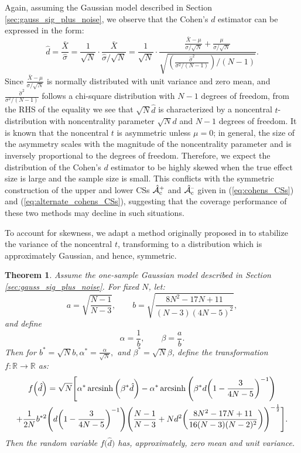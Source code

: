 Again, assuming the Gaussian model described in Section \ref{sec:gauss_sig_plus_noise}, we observe that the Cohen's $d$ estimator can be expressed in the form: 
\begin{equation}
\label{eq:cohens_d_estimator}
\hat{d} = \frac{\bar{X}}{\hat{\sigma}} =  \frac{1}{\sqrt{N}} \cdot \frac{\bar{X}}{\hat{\sigma}/\sqrt{N}} = \frac{1}{\sqrt{N}} \cdot \frac{\frac{\bar{X} - \mu}{\sigma / \sqrt{N}} + \frac{\mu}{\sigma / \sqrt{N}}}{\sqrt{\left(\frac{\hat{\sigma}^{2}}{\sigma^{2}/(N-1)}\right)/(N-1)}}.
\end{equation}
Since $\frac{\bar{X} - \mu}{\sigma / \sqrt{N}}$ is normally distributed with unit variance and zero mean, and $\frac{\hat{\sigma}^{2}}{\sigma^{2}/(N-1)}$ follows a chi-square distribution with $N-1$ degrees of freedom, from the RHS of the equality we see that $\sqrt{N}\hat{d}$ is characterized by a noncentral $t$-distribution with noncentrality parameter $\sqrt{N}d$ and $N - 1$ degrees of freedom. It is known that the noncentral $t$ is asymmetric unless $\mu = 0$; in general, the size of the asymmetry scales with the magnitude of the noncentrality parameter and is inversely proportional to the degrees of freedom. Therefore, we expect the distribution of the Cohen's $d$ estimator to be highly skewed when the true effect size is large and the sample size is small. This conflicts with the symmetric construction of the upper and lower CSs $\operatorname{\hat{\mathcal{A}}_{c}^+}$ and $\operatorname{\hat{\mathcal{A}}_{c}^{\textrm{--}}}$ given in (\ref{eq:cohens_CSs}) and (\ref{eq:alternate_cohens_CSs}), suggesting that the coverage performance of these two methods may decline in such situations. 

To account for skewness, we adapt a method originally proposed in \citet*{Laubscher1960-px} to stabilize the variance of the noncentral $t$, transforming to a distribution which is approximately Gaussian, and hence, symmetric.
\newtheorem{cohen_theorem}{Theorem}
\begin{cohen_theorem} 
\label{thm:Theorem_1}
Assume the one-sample Gaussian model described in Section \ref{sec:gauss_sig_plus_noise}. For fixed $N$, let: $$a = \sqrt{\frac{N-1}{N-3}}, \qquad b = \sqrt{\frac{8N^{2}-17N + 11}{(N-3)(4N-5)^{2}}},$$
and define $$\alpha = \frac{1}{b}, \qquad \beta = \frac{a}{b}.$$
Then for $b^{*}=\sqrt{N}b, \alpha^{*}=\frac{\alpha}{\sqrt{N}},$ and $\beta^{*}=\sqrt{N}\beta$, define the transformation $f : \mathbb{R} \rightarrow \mathbb{R}$ as:
\begin{multline}
    f\Big(\hat{d}\Big) = \sqrt{N} \Bigg[\alpha^{*} \operatorname{arcsinh}\bigg({\beta^{*} \hat{d}}\bigg) - \alpha^{*} \operatorname{arcsinh}\Bigg({\beta^{*} d} \bigg(1 - \frac{3}{4N - 5}\bigg)^{-1} \Bigg) \\
                + \frac{1}{2N}b^{*2}\Bigg(d \bigg(1 - \frac{3}{4N - 5}\bigg)^{-1} \Bigg)\Bigg(\frac{N-1}{N-3} + N d^{2} \bigg(\frac{8N^{2} - 17N + 11}{16(N-3)(N-2)^{2}} \bigg)\Bigg)^{-\frac{1}{2}} \Bigg].
\end{multline}
Then the random variable $f\Big(\hat{d}\Big)$ has, approximately, zero mean and unit variance.  
\end{cohen_theorem}

